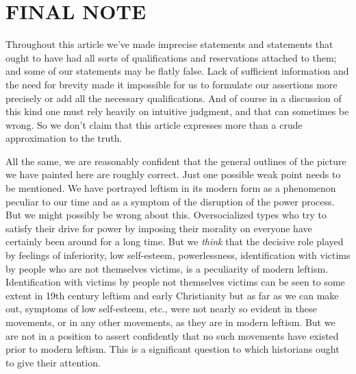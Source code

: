\chapter{FINAL NOTE}

 Throughout this article we’ve made imprecise statements and statements that ought to have had all sorts of qualifications and reservations attached to them; and some of our statements may be flatly false. Lack of sufficient information and the need for brevity made it impossible for us to formulate our assertions more precisely or add all the necessary qualifications. And of course in a discussion of this kind one must rely heavily on intuitive judgment, and that can sometimes be wrong. So we don’t claim that this article expresses more than a crude approximation to the truth.

 All the same, we are reasonably confident that the general outlines of the picture we have painted here are roughly correct. Just one possible weak point needs to be mentioned. We have portrayed leftism in its modern form as a phenomenon peculiar to our time and as a symptom of the disruption of the power process. But we might possibly be wrong about this. Oversocialized types who try to satisfy their drive for power by imposing their morality on everyone have certainly been around for a long time. But we {\em think} that the decisive role played by feelings of inferiority, low self-esteem, powerlessness, identification with victims by people who are not themselves victims, is a peculiarity of modern leftism. Identification with victims by people not themselves victims can be seen to some extent in 19th century leftism and early Christianity but as far as we can make out, symptoms of low self-esteem, etc., were not nearly so evident in these movements, or in any other movements, as they are in modern leftism. But we are not in a position to assert confidently that no such movements have existed prior to modern leftism. This is a significant question to which historians ought to give their attention.
